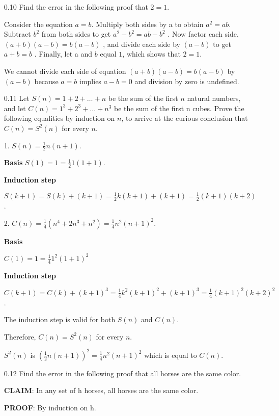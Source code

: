 \documentclass[12pt, a4paper]{article}
\begin{document}
\begin{enumerate}

    \item[0.10]
Find the error in the following proof that $2 = 1$. 

Consider the equation $a = b$. Multiply both sides by a to obtain 
$a^2 = ab$. 
Subtract 
$b^2$ 
from both sides to get 
$a^2 - b^2 = ab - b^2$
. Now factor each side, 
$(a + b)(a - b) = b(a - b)$
, and divide each side by 
$(a - b)$ 
to get 
$a + b = b$
. Finally, let a and $b$ equal $1$, which shows that $2 = 1$.


We cannot divide each side of equation $(a + b)(a - b) = b(a - b)$ by $(a - b)$ because $a = b$ implies $a - b = 0$ and division by zero is undefined.

    \item[0.11]
Let $S(n) = 1 + 2 + \ldots + n$ be the sum of the first $n$ natural numbers, and let $C(n) = 1^3 + 2^3 + \ldots + n^3$ be the sum of the first n cubes. Prove the following equalities by induction on $n$, to arrive at the curious conclusion that $C(n) = S^2(n)$ for every $n$.

1. $S(n) = \frac{1}{2} n(n+1)$.

\textbf{Basis}
$ S(1) = 1 = \frac{1}{2} 1(1+1)$.

\textbf{Induction step}

$ S(k+1) = S(k) + (k+1) = \frac{1}{2} k(k+1) + (k+1) = \frac{1}{2} (k+1)(k+2)$.

2. $C(n) = \frac{1}{4}(n^4 + 2n^3 + n^2) = \frac{1}{4} n^2(n+1)^2$.

\textbf{Basis}

$ C(1) = 1 = \frac{1}{4} 1^2(1+1)^2$

\textbf{Induction step}

$ C(k+1) = C(k) + (k+1)^3 = \frac{1}{4} k^2(k+1)^2 + (k+1)^3 = \frac{1}{4} (k+1)^2(k+2)^2$.

The induction step is valid for both $S(n)$ and $C(n)$. 

Therefore, $C(n) = S^2(n)$ for every $n$.

$S^2(n)$ is $(\frac{1}{2} n(n+1))^2 = \frac{1}{4} n^2(n+1)^2$ which is equal to $C(n)$.

    \item[0.12]
Find the error in the following proof that all horses are the same color.

\textbf{CLAIM}: In any set of h horses, all horses are the same color.

\textbf{PROOF}: By induction on h.


\end{enumerate}
\end{document}
